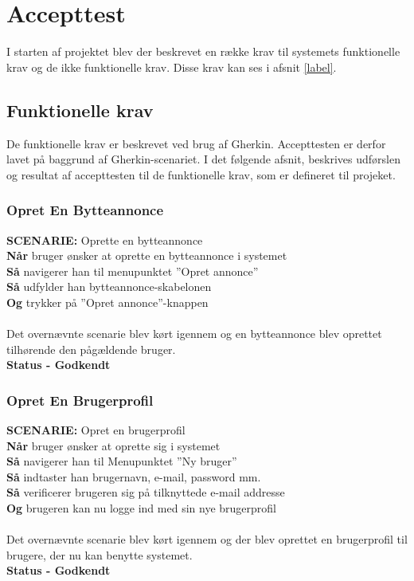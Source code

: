 \chapter{Accepttest}
I starten af projektet blev der beskrevet en række krav til systemets funktionelle krav og de ikke funktionelle krav. Disse krav kan ses i afsnit \ref{label}.

\section{Funktionelle krav}
De funktionelle krav er beskrevet ved brug af Gherkin. Accepttesten er derfor lavet på baggrund af Gherkin-scenariet. I det følgende afsnit, beskrives udførslen og resultat af accepttesten til de funktionelle krav, som er defineret til projeket.

\subsection{Opret En Bytteannonce}
{\color{blue}\textbf{SCENARIE:}} Oprette en bytteannonce \\ 
{\color{blue}\textbf{Når}}  bruger ønsker at oprette en bytteannonce i systemet \\
{\color{blue}\textbf{Så}} navigerer han til menupunktet ”Opret annonce” \\
{\color{blue}\textbf{Så}} udfylder han bytteannonce-skabelonen \\
{\color{blue}\textbf{Og}} trykker på ”Opret annonce”-knappen \\ \\
Det overnævnte scenarie blev kørt igennem og en bytteannonce blev oprettet tilhørende den pågældende bruger. \\
\textbf{Status - Godkendt}

\subsection{Opret En Brugerprofil}
{\color{blue}\textbf{SCENARIE:}} Opret en brugerprofil \\
{\color{blue}\textbf{Når}} bruger ønsker at oprette sig i systemet \\
{\color{blue}\textbf{Så}} navigerer han til Menupunktet ”Ny bruger” \\
{\color{blue}\textbf{Så}} indtaster han brugernavn, e-mail, password mm.\\
{\color{blue}\textbf{Så}} verificerer brugeren sig på tilknyttede e-mail addresse\\
{\color{blue}\textbf{Og}} brugeren kan nu logge ind med sin nye brugerprofil \\ \\
Det overnævnte scenarie blev kørt igennem og der blev oprettet en brugerprofil til brugere, der nu kan benytte systemet.  \\
\textbf{Status - Godkendt}

